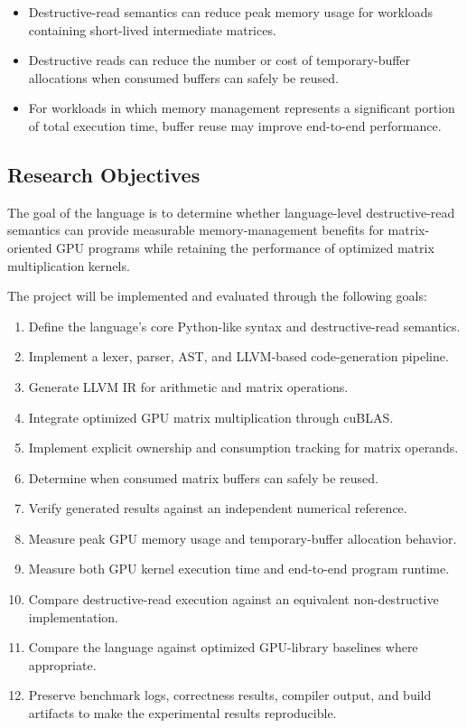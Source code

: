\documentclass[a4paper]{article}
\begin{document}
	\begin{itemize}
		\item Destructive-read semantics can reduce peak memory usage for workloads containing short-lived intermediate matrices.
		\item Destructive reads can reduce the number or cost of temporary-buffer allocations when consumed buffers can safely be reused.
		\item For workloads in which memory management represents a significant portion of total execution time, buffer reuse may improve end-to-end performance.
	\end{itemize}
	
	\subsection{Research Objectives}
	
	The goal of the language is to determine whether language-level destructive-read semantics can provide measurable memory-management benefits for matrix-oriented GPU programs while retaining the performance of optimized matrix multiplication kernels.
	
	The project will be implemented and evaluated through the following goals:
	
	\begin{enumerate}
		\item Define the language's core Python-like syntax and destructive-read semantics.
		\item Implement a lexer, parser, AST, and LLVM-based code-generation pipeline.
		\item Generate LLVM IR for arithmetic and matrix operations.
		\item Integrate optimized GPU matrix multiplication through cuBLAS.
		\item Implement explicit ownership and consumption tracking for matrix operands.
		\item Determine when consumed matrix buffers can safely be reused.
		\item Verify generated results against an independent numerical reference.
		\item Measure peak GPU memory usage and temporary-buffer allocation behavior.
		\item Measure both GPU kernel execution time and end-to-end program runtime.
		\item Compare destructive-read execution against an equivalent non-destructive implementation.
		\item Compare the language against optimized GPU-library baselines where appropriate.
		\item Preserve benchmark logs, correctness results, compiler output, and build artifacts to make the experimental results reproducible.
	\end{enumerate}
	
\end{document}
